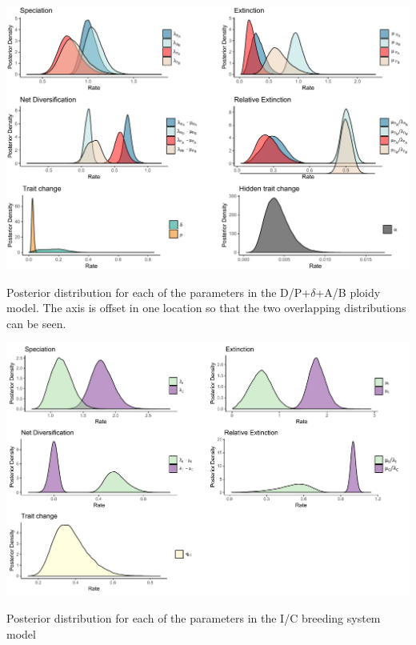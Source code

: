 
\begin{suppfigure}
\includegraphics[width=\textwidth]{hisseDPposteriordist.pdf}
\caption{Posterior distribution for each of the parameters in the D/P+$\delta$+A/B ploidy model.  The axis is offset in one location so that the two overlapping distributions can be seen.} %
\label{suppfigure:DPAB}
\end{suppfigure}


\begin{suppfigure}
\includegraphics[width=\textwidth]{bisseSIposteriordist.pdf}
\caption{Posterior distribution for each of the parameters in the I/C breeding system model} %
\label{suppfigure:IC}
\end{suppfigure}

